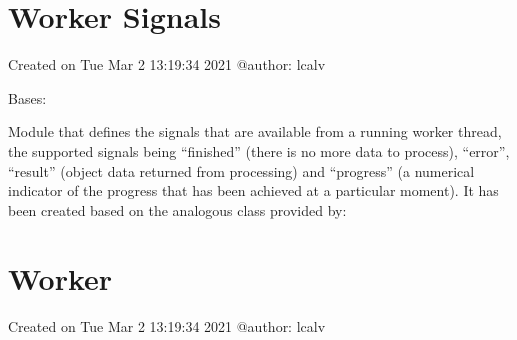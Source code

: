 \documentclass[letterpaper,10pt,english]{sphinxmanual}
\begin{document}
\chapter{Worker Signals}
\label{\detokenize{gui_worker_signals:worker-signals}}\label{\detokenize{gui_worker_signals::doc}}\label{\detokenize{gui_worker_signals:module-src.graphical_user_interface.worker_signals}}
\sphinxAtStartPar
Created on Tue Mar  2 13:19:34 2021
@author: lcalv

\begin{fulllineitems}
\label{\detokenize{gui_worker_signals:src.graphical_user_interface.worker_signals.WorkerSignals}}
\sphinxAtStartPar
Bases: 

\sphinxAtStartPar
Module that defines the signals that are available from a running
worker thread, the supported signals being “finished” (there is no more data to process),
“error”, “result” (object data returned from processing) and “progress” (a
numerical indicator of the progress that has been achieved at a particular moment).
It has been created based on the analogous class provided by:

\end{fulllineitems}



\chapter{Worker}
\label{\detokenize{gui_worker:worker}}\label{\detokenize{gui_worker::doc}}\label{\detokenize{gui_worker:module-src.graphical_user_interface.worker}}
\sphinxAtStartPar
Created on Tue Mar  2 13:19:34 2021
@author: lcalv
\end{document}
